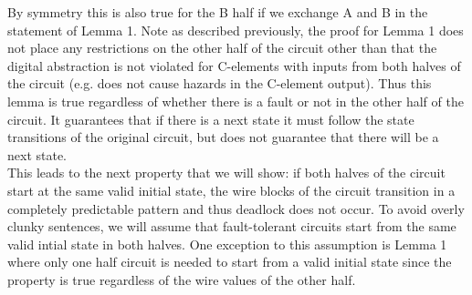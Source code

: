 \documentclass[12pt]{report}
\begin{document}
By symmetry this is also true for the B half if we exchange A and B in the statement of Lemma 1.  
Note as described previously, the proof for Lemma 1 does not place any restrictions on the other half of the circuit other than that the digital abstraction is not violated for C-elements with inputs from both halves of the circuit (e.g. does not cause hazards in the C-element output).  Thus this lemma is true regardless of whether there is a fault or not in the other half of the circuit.  It guarantees that if there is a next state it must follow the state transitions of the original circuit, but does not guarantee that there will be a next state.\\  %

This leads to the next property that we will show: if both halves of the circuit start at the same valid initial state, the wire blocks of the circuit transition in a completely predictable pattern and thus deadlock does not occur.
To avoid overly clunky sentences, we will assume that fault-tolerant circuits start from the same valid intial state in both halves.  One exception to this assumption is Lemma 1 where only one half circuit is needed to start from a valid initial state since the property is true regardless of the wire values of the other half.
\end{document}
